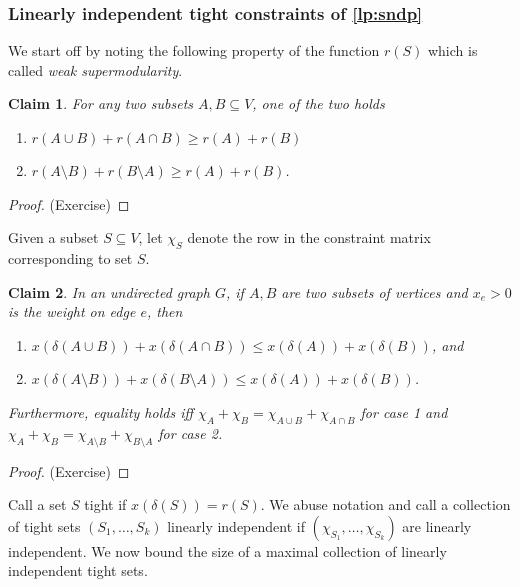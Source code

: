 \documentclass[11pt]{article}
\newtheorem{claim}{Claim}
\begin{document}
\subsubsection*{Linearly independent tight constraints of \eqref{lp:sndp}}
We start off by noting the following property of the function $r(S)$ which is called {\em weak supermodularity}.

\begin{claim}\label{claim:claim1}
For any two subsets $A,B\subseteq V$, one of the two holds
\begin{enumerate}
\item $r(A \cup B) + r(A \cap B) \ge r(A) + r(B)$
\item $r(A \setminus B) + r(B \setminus A) \ge r(A) + r(B)$.
\end{enumerate}
\end{claim}
\begin{proof}
(Exercise)
\end{proof}
\noindent
Given a subset $S\subseteq V$, let $\chi_S$ denote the row in the constraint matrix corresponding to set $S$.

\begin{claim}\label{claim:cuts}
In an undirected graph $G$, if $A,B$ are two subsets of vertices and $x_e > 0$ is the weight on edge $e$,
then 
\begin{enumerate}
\item $x(\delta(A \cup B)) + x(\delta(A \cap B)) \le x(\delta(A)) + x(\delta(B))$, and 
\item $x(\delta(A \setminus B)) + x(\delta(B \setminus A)) \le x(\delta(A)) + x(\delta(B)) $.
\end{enumerate}
Furthermore, equality holds iff $\chi_A + \chi_B = \chi_{A\cup B} + \chi_{A\cap B}$ for case 1 and 
$\chi_A + \chi_B = \chi_{A\setminus B} + \chi_{B\setminus A}$ for case 2.
\end{claim}
\begin{proof}(Exercise)
\end{proof}


Call a set $S$ tight if $x(\delta(S)) = r(S)$. 
We abuse notation and call a collection of tight sets $(S_1,\ldots,S_k)$ linearly independent if 
$(\chi_{S_1},\ldots,\chi_{S_k})$ are linearly independent. We now bound the size of a maximal collection of linearly independent tight sets.
\end{document}
